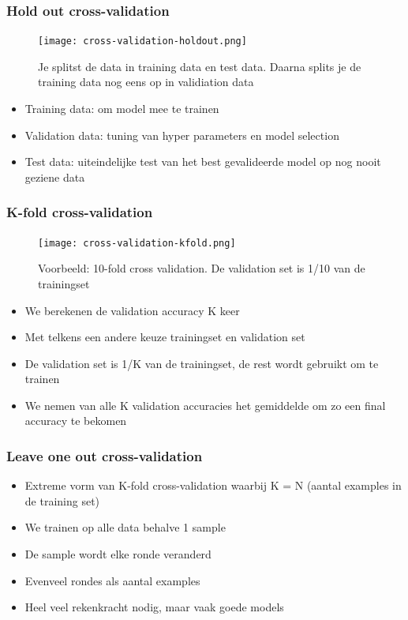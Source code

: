 \documentclass{article}
\begin{document}
\subsubsection{Hold out cross-validation}

\begin{figure}[H]
    \centering
    \texttt{[image: cross-validation-holdout.png]}
    \caption{Je splitst de data in training data en test data. Daarna splits je de training data nog eens op in validiation data}
\end{figure}

\begin{itemize}
    \item Training data: om model mee te trainen
    \item Validation data: tuning van hyper parameters en model selection
    \item Test data: uiteindelijke test van het best gevalideerde model op nog nooit geziene data
\end{itemize}

\subsubsection{K-fold cross-validation}

\begin{figure}[H]
    \centering
    \texttt{[image: cross-validation-kfold.png]}
    \caption{Voorbeeld: 10-fold cross validation. De validation set is 1/10 van de trainingset}
\end{figure}

\begin{itemize}
    \item We berekenen de validation accuracy K keer
    \item Met telkens een andere keuze trainingset en validation set
    \item De validation set is 1/K van de trainingset, de rest wordt gebruikt om te trainen
    \item We nemen van alle K validation accuracies het gemiddelde om zo een final accuracy te bekomen
\end{itemize}

\subsubsection{Leave one out cross-validation}

\begin{itemize}
    \item Extreme vorm van K-fold cross-validation waarbij K = N (aantal examples in de training set)
    \item We trainen op alle data behalve 1 sample
    \item De sample wordt elke ronde veranderd
    \item Evenveel rondes als aantal examples
    \item Heel veel rekenkracht nodig, maar vaak goede models
\end{itemize}
\end{document}
